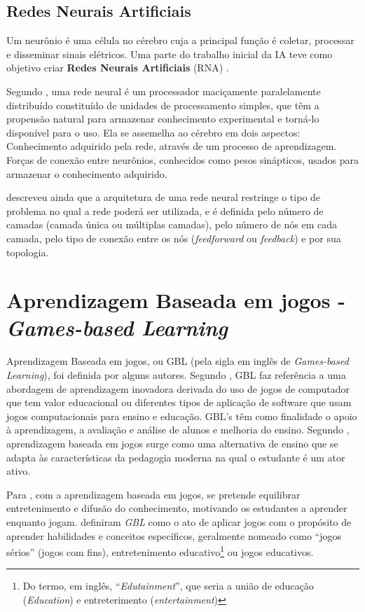 \documentclass[
	12pt,				%
	openright,			%
	oneside,
	a4paper,			%
	english,			%
	french,				%
	spanish,			%
	brazil,				%
	]{abntex2}
\begin{document}
\subsection{Redes Neurais Artificiais}
\label{sec:RNA}
Um neurônio é uma célula no cérebro cuja a principal função é coletar, processar e disseminar sinais elétricos. Uma parte do trabalho inicial da IA teve como objetivo criar \textbf{Redes Neurais Artificiais} (RNA) \cite{russell2004inteligencia}.

Segundo , uma rede neural é um processador maciçamente paralelamente distribuído constituído de unidades de processamento simples, que têm a propensão natural para armazenar conhecimento experimental e torná-lo disponível para o uso. Ela se assemelha ao cérebro em dois aspectos: Conhecimento adquirido pela rede, através de um processo de aprendizagem. Forças de conexão entre neurônios, conhecidos como pesos sinápticos, usados para armazenar o conhecimento adquirido.

 descreveu ainda que a arquitetura de uma rede neural restringe o tipo de problema no qual a rede poderá ser utilizada, e é definida pelo número de camadas (camada única ou múltiplas camadas), pelo número de nós em cada camada, pelo tipo de conexão entre os nós (\textit{feedforward} ou \textit{feedback}) e por sua topologia.

\section{Aprendizagem Baseada em jogos - \textit{Games-based Learning}}
\label{sec:GBL}

Aprendizagem Baseada em jogos, ou GBL (pela sigla em inglês de \textit{Games-based Learning}), foi definida por alguns autores. Segundo , GBL faz referência a uma abordagem de aprendizagem inovadora derivada do uso de jogos de computador que tem valor educacional ou diferentes tipos de aplicação de software que usam jogos computacionais para ensino e educação. GBL's têm como finalidade o apoio à aprendizagem, a avaliação e análise de alunos e melhoria do ensino. Segundo , aprendizagem baseada em jogos surge como uma alternativa de ensino que se adapta às características da pedagogia moderna na qual o estudante é um ator ativo.

Para , com a aprendizagem baseada em jogos, se pretende equilibrar entretenimento e difusão do conhecimento, motivando os estudantes a aprender enquanto jogam.  definiram \textit{GBL} como o ato de aplicar jogos com o propósito de aprender habilidades e conceitos específicos, geralmente nomeado como “jogos sérios” (jogos com fins), entretenimento educativo\footnote{Do termo, em inglês, “\textit{Edutainment}”, que seria a união de educação (\textit{Education}) e entreterimento (\textit{entertainment})} ou jogos educativos.
\end{document}

